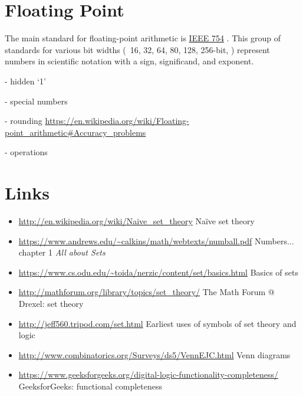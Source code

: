 \documentclass[11pt]{article}%
\begin{document}
\begin{multicols}{2}
\section{Floating Point}
\label{FloatingPoint}


The main standard for floating-point arithmetic is \href{https://en.wikipedia.org/wiki/IEEE_754}{IEEE 754} \parencite{wiki:ieee-754}. This group of standards for various bit widths (\eg\ 16, 32, 64, 80, 128, 256-bit, \etc) represent numbers in scientific notation with a sign, significand, and exponent. 

- hidden `1'

- special numbers

- rounding \url{https://en.wikipedia.org/wiki/Floating-point_arithmetic#Accuracy_problems}

- operations

\section{Links}
\label{Links}

\begin{itemize}

\item \url{http://en.wikipedia.org/wiki/Naive_set_theory} Na\"ive set
theory

\item \url{https://www.andrews.edu/~calkins/math/webtexts/numball.pdf}
Numbers... chapter 1 \textit{All about Sets}

\item \url{https://www.cs.odu.edu/~toida/nerzic/content/set/basics.html} Basics of sets

\item \url{http://mathforum.org/library/topics/set_theory/} The Math
Forum @ Drexel: set theory

\item \url{http://jeff560.tripod.com/set.html} Earliest uses of
symbols of set theory and logic

\item \url{http://www.combinatorics.org/Surveys/ds5/VennEJC.html}
Venn diagrams

\item \url{https://www.geeksforgeeks.org/digital-logic-functionality-completeness/} GeeksforGeeks: functional completeness


\end{itemize}
\end{multicols}
\end{document}
